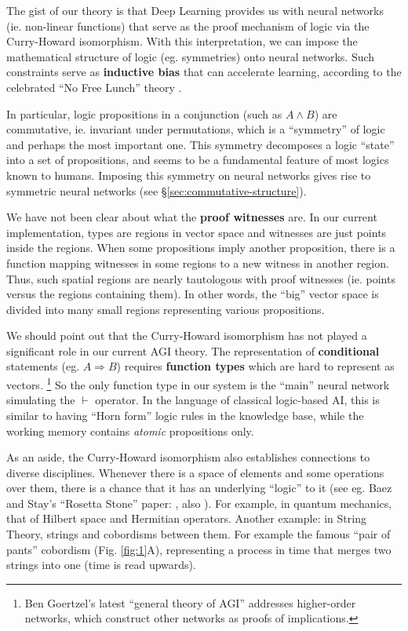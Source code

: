 \documentclass[orivec]{llncs}
\begin{document}
The gist of our theory is that Deep Learning provides us with neural networks (ie. non-linear functions) that serve as the proof mechanism of logic via the Curry-Howard isomorphism.  With this interpretation, we can impose the mathematical structure of logic (eg. symmetries) onto neural networks.  Such constraints serve as \textbf{inductive bias} that can accelerate learning, according to the celebrated ``No Free Lunch'' theory \cite{Wolpert1997} \cite{Alpaydin2020} \cite{Shalev-Shwartz2014}.

In particular, logic propositions in a conjunction (such as $A \wedge B$) are commutative, ie. invariant under permutations, which is a ``symmetry'' of logic and perhaps the most important one.  This symmetry decomposes a logic ``state'' into a set of propositions, and seems to be a fundamental feature of most logics known to humans.  Imposing this symmetry on neural networks gives rise to symmetric neural networks (see \S\ref{sec:commutative-structure}).

We have not been clear about what the \textbf{proof witnesses} are.  In our current implementation, types are regions in vector space and witnesses are just points inside the regions.  When some propositions imply another proposition, there is a function mapping witnesses in some regions to a new witness in another region.  Thus, such spatial regions are nearly tautologous with proof witnesses (ie. points versus the regions containing them).  In other words, the ``big'' vector space is divided into many small regions representing various propositions.

We should point out that the Curry-Howard isomorphism has not played a significant role in our current AGI theory.  The representation of \textbf{conditional} statements (eg. $A \Rightarrow B$) requires \textbf{function types} which are hard to represent as vectors. \footnote{ Ben Goertzel's latest ``general theory of AGI'' \cite{Goertzel2021} addresses higher-order networks, which construct other networks as proofs of implications. }  So the only function type in our system is the ``main'' neural network simulating the $\vdash$ operator.  In the language of classical logic-based AI, this is similar to having  ``Horn form'' logic rules in the knowledge base, while the working memory contains \textit{atomic} propositions only.

As an aside, the Curry-Howard isomorphism also establishes connections to diverse disciplines.  Whenever there is a space of elements and some operations over them, there is a chance that it has an underlying ``logic'' to it (see eg. Baez and Stay's ``Rosetta Stone'' paper: \cite{Baez2010}, also \cite{Heunen2019}).  For example, in quantum mechanics, that of Hilbert space and Hermitian operators.  Another example: in String Theory, strings and cobordisms between them.  For example the famous ``pair of pants'' cobordism (Fig. \ref{fig:1}A), representing a process in time that merges two strings into one (time is read upwards).
\end{document}
